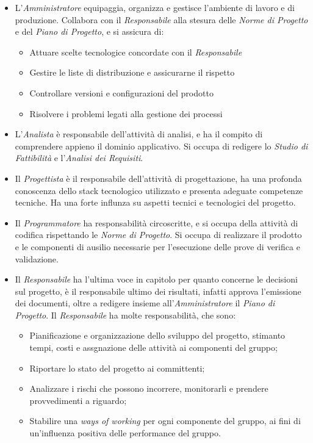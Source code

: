 \begin{itemize}

\item[Amministratore] L'\textit{Amministratore} equipaggia, organizza e gestisce l'ambiente di lavoro e di produzione. Collabora con il \textit{Responsabile} alla stesura delle \textit{Norme di Progetto} e del \textit{Piano di Progetto}, e si assicura di:
  \begin{itemize}

  \item Attuare scelte tecnologice concordate con il \textit{Responsabile}
  \item Gestire le liste di distribuzione e assicurarne il rispetto
  \item Controllare versioni e configurazioni del prodotto
  \item Risolvere i problemi legati alla gestione dei processi
    
  \end{itemize}

\item[Analista] L'\textit{Analista} \`e responsabile dell'attivit\`a di analisi, e ha il compito di comprendere appieno il dominio applicativo. Si occupa di redigere lo \textit{Studio di Fattibilit\`a} e l'\textit{Analisi dei Requisiti}.

\item[Progettista] Il \textit{Progettista} \`e il responsabile dell'attivit\`a di progettazione, ha una profonda conoscenza dello stack tecnologico utilizzato e presenta adeguate competenze tecniche. Ha una forte influnza su aspetti tecnici e tecnologici del progetto.

\item[Programmatore] Il \textit{Programmatore} ha responsabilit\`a circoscritte, e si occupa della attivit\`a di codifica rispettando le \textit{Norme di Progetto}. Si occupa di realizzare il prodotto e le componenti di ausilio necessarie per l'esecuzione delle prove di verifica e validazione.

\item[Responsabile] Il \textit{Responsabile} ha l'ultima voce in capitolo per quanto concerne le decisioni sul progetto, \`e il responsabile ultimo dei risultati, infatti approva l'emissione dei documenti, oltre a redigere insieme all'\textit{Amministratore} il \textit{Piano di Progetto}. Il \textit{Responsabile} ha molte responsabilit\`a, che sono:
  \begin{itemize}

  \item Pianificazione e organizzazione dello sviluppo del progetto, stimanto tempi, costi e assgnazione delle attivit\`a ai componenti del gruppo;
  \item Riportare lo stato del progetto ai committenti;
  \item Analizzare i rischi che possono incorrere, monitorarli e prendere provvedimenti a riguardo;
  \item Stabilire una \textit{ways of working} per ogni componente del gruppo, ai fini di un'influenza positiva delle performance del gruppo.
    

\end{itemize}
\end{itemize}

